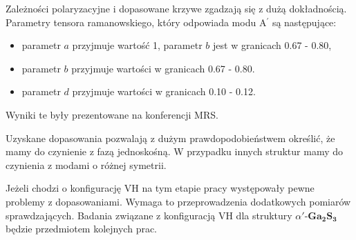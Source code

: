 Zależności polaryzacyjne i dopasowane krzywe zgadzają się z dużą dokładnością. Parametry tensora ramanowskiego, który odpowiada modu A$^{'}$ są następujące:
\begin{itemize}
	\item parametr $a$ przyjmuje wartość 1, parametr $b$ jest w granicach 0.67 - 0.80, 
	\item parametr $b$ przyjmuje wartości w granicach 0.67 - 0.80.
	\item parametr $d$ przyjmuje wartości w granicach 0.10 - 0.12.
\end{itemize}
Wyniki te były prezentowane na konferencji MRS.

Uzyskane dopasowania pozwalają z dużym prawdopodobieństwem określić, że mamy do czynienie z fazą jednoskośną. W przypadku innych struktur mamy do czynienia z modami o różnej symetrii.

Jeżeli chodzi o konfigurację VH na tym etapie pracy występowały pewne problemy z dopasowaniami. Wymaga to przeprowadzenia dodatkowych pomiarów sprawdzających. Badania związane z konfiguracją VH dla struktury $\alpha'$-$\mathbf{Ga_{2}S_{3}}$ będzie przedmiotem kolejnych prac.




